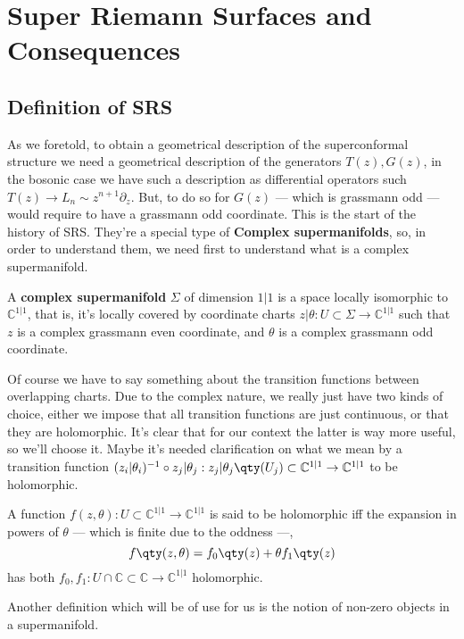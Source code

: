 \section{Super Riemann Surfaces and Consequences}
\label{sec:form}

\subsection{Definition of SRS}

As we foretold, to obtain a geometrical description of the superconformal structure we need a geometrical 
description of the generators $T(z),G(z)$, in the bosonic case we have such a description as differential 
operators such $T(z)\rightarrow L_n\sim z^{n+1}\partial_z$. But, to do so for $G(z)$ --- which is 
grassmann odd --- would require to have a grassmann odd coordinate. This is the start of the history of 
SRS. They're a special type of \textbf{Complex supermanifolds}, so, in order to understand them, 
we need first to understand what is a complex supermanifold.
\begin{definition}
    A \textbf{complex supermanifold} $\Sigma$ of dimension $1|1$ is a space locally isomorphic 
    to $\mathbb C^{1|1}$, that is, it's locally covered by coordinate charts $z|\theta:U\subset\Sigma\rightarrow\mathbb C^{1|1}$ 
    such that $z$ is a complex grassmann even coordinate, and $\theta$ is a complex grassmann odd coordinate.
\end{definition}
Of course we have to say something about the transition functions between overlapping charts. Due to the 
complex nature, we really just have two kinds of choice, either we impose that all transition 
functions are just continuous, or that they are holomorphic. It's clear that for our context 
the latter is way more useful, so we'll choose it. Maybe it's needed clarification on what we mean by 
a transition function $(z_i|\theta_i)^{-1}\circ z_j|\theta_j:z_j|\theta_j\qty(U_j)\subset\mathbb C^{1|1}\rightarrow \mathbb C^{1|1}$ 
to be holomorphic.
\begin{definition}
    A function $f(z,\theta):U\subset\mathbb C^{1|1}\rightarrow\mathbb C^{1|1}$ is said to be holomorphic iff 
    the expansion in powers of $\theta$ --- which is finite due to the oddness ---, $$f\qty(z,\theta)=f_0\qty(z)+\theta f_1\qty(z)$$ 
    has both $f_0,f_1: U\cap\mathbb C\subset\mathbb C\rightarrow\mathbb C^{1|1}$ holomorphic.
\end{definition}
Another definition which will be of use for us is the notion of non-zero objects in a supermanifold. 

